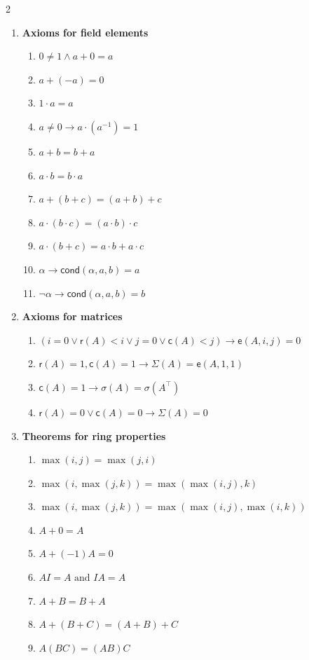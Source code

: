 \documentclass[11pt]{article}
\theoremstyle{definition}
\theoremstyle{plain}
\theoremstyle{remark}
\begin{document}
\begin{multicols}{2}
\begin{enumerate}
    \item \textbf{Axioms for field elements}
    \begin{enumerate}
        \item $0\neq 1\wedge a+0=a$  
        \item $ a+(-a)=0$
        \item $1 \cdot a = a$ 
        \item $a\neq 0\rightarrow a \cdot(a^{-1})=1$
        \item $ a+b = b+a$ 
        \item $ a\cdot b = b\cdot a$ 
        \item $ a+(b+c)=(a+b)+c$
        \item $ a\cdot (b\cdot c)=(a\cdot b)\cdot c$ 
        \item $ a\cdot (b+c)=a\cdot b+a\cdot c$ 
        \item $\alpha \to \mathsf{cond}(\alpha, a, b)=a $
        \item $\neg\alpha\to \mathsf{cond}(\alpha, a, b)=b$
    \end{enumerate}
    \item \textbf{Axioms for matrices}
    \begin{enumerate}
        \item $(i=0\vee \mathsf{r}(A)<i\vee j=0\vee \mathsf{c}(A) <j) \rightarrow \mathsf{e}(A,i,j)=0$
        \item $\mathsf{r}(A)=1, \mathsf{c}(A)=1\rightarrow\Sigma(A)=\mathsf{e}(A,1,1)$
        \item $\mathsf{c}(A)=1 \rightarrow \sigma(A)=\sigma(A^\intercal)$
        \item $\mathsf{r}(A)=0\vee \mathsf{c}(A)=0\rightarrow \Sigma(A)=0$
    \end{enumerate}
    \columnbreak
    \item \textbf{Theorems for ring properties} 
    \begin{enumerate}
        \item $\max(i,j)=\max(j,i)$
        \item $\max(i, \max(j,k))=\max(\max(i,j),k)$
        \item $\max(i,\max(j,k))=\max(\max(i,j),\max(i,k))$
        \item $A+0=A$
        \item $A+(-1)A=0$ 
        \item $AI=A \text{ and } IA=A$ 
        \item $A+B=B+A$ 
        \item $A+(B+C)=(A+B)+C$ 
        \item $A(BC)=(AB)C$ 

\end{enumerate}
\end{enumerate}
\end{multicols}
\end{document}
